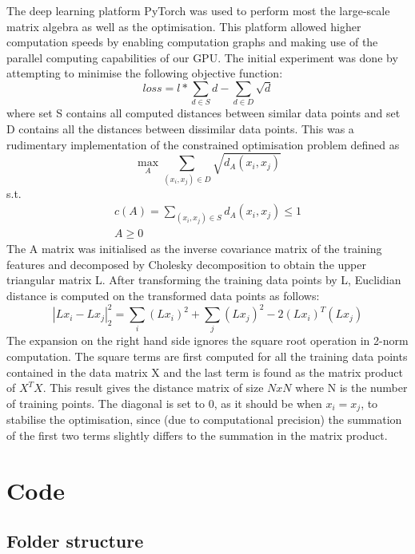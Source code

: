 \documentclass[10pt,technote]{IEEEtran}
\begin{document}
The deep learning platform PyTorch was used to perform most the large-scale matrix algebra as well as the optimisation. This platform allowed higher computation speeds by enabling computation graphs and making use of the parallel computing capabilities of our GPU.
The initial experiment was done by attempting to minimise the following objective function: \begin{equation}
    loss = l*\sum_{d \in S}d -  \sum_{d \in D}\sqrt{d}
\end{equation}
where set S contains all computed distances between similar data points and set D contains all the distances between dissimilar data points. This was a rudimentary implementation of the constrained optimisation problem defined as
\begin{equation}
    \max_{A}\sum_{(x_i, x_j) \in D}\sqrt{d_A (x_i, x_j)}
\end{equation}
s.t.
\begin{equation}
    \begin{aligned}
        c(A) = \sum_{(x_i, x_j) \in S}d_A (x_i, x_j) \le 1 \\
        A \ge 0
    \end{aligned}
\end{equation}
The A matrix was initialised as the 
inverse covariance matrix of the training features and decomposed by Cholesky decomposition to obtain the upper triangular matrix L. After transforming the training data points by L, Euclidian distance is computed on the transformed data points as follows:
\begin{equation}
    |Lx_i - Lx_j|_2^2 = \sum_{i}(Lx_i)^2 + \sum_{j}(Lx_j)^2 - 2(Lx_i)^T(Lx_j)
\end{equation}
The expansion on the right hand side ignores the square root operation in 2-norm computation. The square terms are first computed for all the training data points contained in the data matrix X and the last term is found as the matrix product of $X^TX$. This result gives the distance matrix of size $NxN$ where N is the number of training points. The diagonal is set to 0, as it should be when $x_i = x_j$, to stabilise the optimisation, since (due to computational precision) the summation of the first two terms slightly differs to the summation in the matrix product. 

\section{Code}
\subsection{Folder structure}
\end{document}

